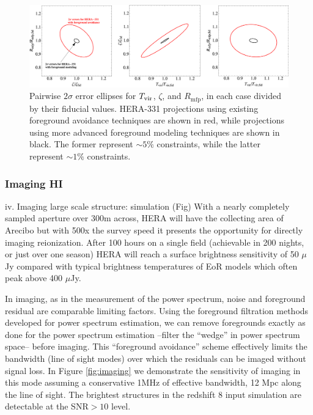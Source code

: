 \documentclass[preprint]{aastex}
\begin{document}
\begin{figure}[t]\centering
\includegraphics[width=\textwidth]{plots/Pspec/OPTMIDellipses.pdf}
\caption{Pairwise $2\sigma$ error ellipses for $T_{\rm vir}$, $\zeta$, and $R_\textrm{mfp}$, in each case divided by their fiducial values.  HERA-331 projections using existing foreground avoidance techniques are shown in red, while projections using more advanced foreground modeling techniques are shown in black.  The former represent $\sim 5\%$ constraints, while the latter represent $\sim 1\%$ constraints.\label{fig:ErrorEllipses}}
\end{figure}


\subsubsection{Imaging HI}
iv. Imaging large scale structure: simulation (Fig) 
With a nearly completely sampled aperture over 300m across, HERA will have the collecting area of Arecibo but with 500x the survey speed it presents the opportunity for directly imaging reionization.  After 100 hours on a single field (achievable in 200 nights, or just over one season) HERA will reach a surface brightness sensitivity of 50 $\mu$Jy compared with typical brightness temperatures of EoR models which often peak above 400 $\mu$Jy.

In imaging, as in the measurement of the power spectrum, noise and foreground residual are comparable limiting factors. Using the foreground filtration methods developed for power spectrum estimation, we can remove foregrounds exactly as done for the power spectrum estimation --filter the ``wedge'' in power spectrum space-- before imaging.  This ``foreground avoidance'' scheme effectively limits the bandwidth (line of sight modes) over which the residuals can be imaged without signal loss.  In Figure \ref{fig:imaging} we demonstrate the sensitivity of imaging in this mode assuming a conservative 1MHz of effective bandwidth, 12 Mpc along the line of sight.  The brightest structures in the redshift 8 input simulation are detectable at the SNR$>10$ level.
\end{document}
